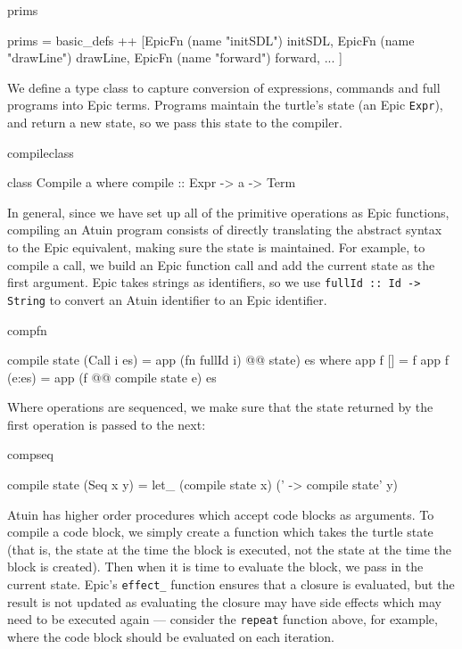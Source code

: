\begin{SaveVerbatim}{prims}

prims = basic_defs ++ [EpicFn (name "initSDL") initSDL,
                       EpicFn (name "drawLine") drawLine,
                       EpicFn (name "forward") forward, ... ]

\end{SaveVerbatim}

\noindent
We define a type class to capture conversion of expressions, commands
and full programs into Epic terms. Programs
maintain the turtle's state (an Epic \texttt{Expr}), and return a new
state, so we pass this state to the compiler.

\begin{SaveVerbatim}{compileclass}

class Compile a where
    compile :: Expr -> a -> Term

\end{SaveVerbatim}

\noindent
In general, since we have set up all of the primitive operations as
Epic functions, compiling an Atuin program consists of directly
translating the abstract syntax to the Epic equivalent, making sure
the state is maintained. For example, to compile a call, we
build an Epic function call and add the current state as the first
argument. Epic takes strings as identifiers, so we use \texttt{fullId
  :: Id -> String} to convert an Atuin identifier to an Epic identifier.

\begin{SaveVerbatim}{compfn}

compile state (Call i es) = app (fn fullId i) @@ state) es
   where app f [] = f
         app f (e:es) = app (f @@ compile state e) es

\end{SaveVerbatim}

\noindent
Where operations are sequenced, we make sure that the state returned
by the first operation is passed to the next:

\begin{SaveVerbatim}{compseq}

compile state (Seq x y) 
   = let_ (compile state x) (\state' -> compile state' y)

\end{SaveVerbatim}

Atuin has higher order procedures which accept code blocks as
arguments. To compile a code block, we simply create a function which
takes the turtle state (that is, the state at the time the block is
executed, not the state at the time the block is created). Then when
it is time to evaluate the block, we pass in the current state. Epic's
\texttt{effect\_} function ensures that a closure is evaluated, but
the result is not updated as evaluating the closure may have side
effects which may need to be executed again --- consider the
\texttt{repeat} function above, for example, where the code block
should be evaluated on each iteration.

